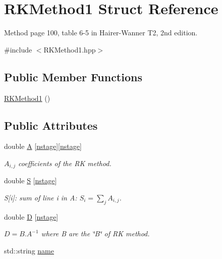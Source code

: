 \hypertarget{structRKMethod1}{\section{R\-K\-Method1 Struct Reference}
\label{structRKMethod1}
}


Method page 100, table 6-\/5 in Hairer-\/\-Wanner T2, 2nd edition.  




{\ttfamily \#include $<$R\-K\-Method1.\-hpp$>$}

\subsection*{Public Member Functions}
\begin{DoxyCompactItemize}
\item 
\hyperlink{structRKMethod1_a2b70c374f25fa04c50f8d6cfc8445811}{R\-K\-Method1} ()
\end{DoxyCompactItemize}
\subsection*{Public Attributes}
\begin{DoxyCompactItemize}
\item 
double \hyperlink{structRKMethod1_a9d63b61d30abbc237c1ed99146a8e229}{A} \mbox{[}\hyperlink{structRKMethod1_a60cd377e618300470e679691c7f8a924}{nstage}\mbox{]}\mbox{[}\hyperlink{structRKMethod1_a60cd377e618300470e679691c7f8a924}{nstage}\mbox{]}
\begin{DoxyCompactList}\small\item\em $ A_{i,j}$ coefficients of the R\-K method. \end{DoxyCompactList}\item 
double \hyperlink{structRKMethod1_afce9377a7835fb7cccacf55ac1c10c4d}{S} \mbox{[}\hyperlink{structRKMethod1_a60cd377e618300470e679691c7f8a924}{nstage}\mbox{]}
\begin{DoxyCompactList}\small\item\em S\mbox{[}i\mbox{]}\-: sum of line i in A\-: $ S_i= \sum_j A_{i,j}$. \end{DoxyCompactList}\item 
double \hyperlink{structRKMethod1_a30390120c364f0c0691c355a9a7c0950}{D} \mbox{[}\hyperlink{structRKMethod1_a60cd377e618300470e679691c7f8a924}{nstage}\mbox{]}
\begin{DoxyCompactList}\small\item\em $ D= B.A^{-1} $ where B are the \char`\"{}\-B\char`\"{} of R\-K method. \end{DoxyCompactList}\item 
std\-::string \hyperlink{structRKMethod1_a04a57de1e4be2c564f267bad3cc04f62}{name}
\end{DoxyCompactItemize}
